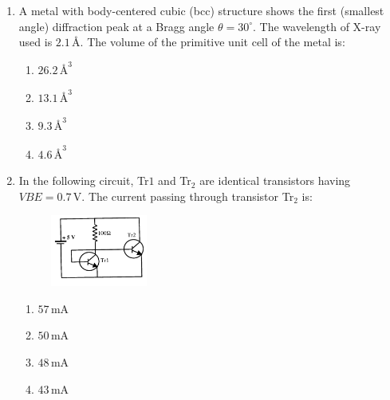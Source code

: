 \documentclass[journal,12pt,onecolumn]{IEEEtran}
\begin{document}
\begin{enumerate}
\begin{multicols}{4}
\begin{enumerate}
    \item $20\,\mathrm{cm^{-1}}$
    \item $40\,\mathrm{cm^{-1}}$
    \item $60\,\mathrm{cm^{-1}}$
    \item $120\,\mathrm{cm^{-1}}$
\end{enumerate}
\end{multicols}

\item A metal with body-centered cubic (bcc) structure shows the first (smallest angle) diffraction peak at a Bragg angle $\theta = 30^\circ$. The wavelength of X-ray used is $2.1\,\text{\AA}$. The volume of the primitive unit cell of the metal is:

\hfill{}

\begin{multicols}{4}
\begin{enumerate}
    \item $26.2\,\text{\AA}^3$
    \item $13.1\,\text{\AA}^3$
    \item $9.3\,\text{\AA}^3$
    \item $4.6\,\text{\AA}^3$
\end{enumerate}
\end{multicols}

\item In the following circuit, Tr$1$ and Tr$_2$ are identical transistors having $V{BE} = 0.7\,\mathrm{V}$. The current passing through transistor Tr$_2$ is:

\begin{figure}[ht!]
    \centering
    \includegraphics[width=0.3\textwidth]{fig6.jpeg}
    \caption{}
    \label{fig:fig6.jpeg}
\end{figure}


\hfill{}

\begin{multicols}{4}
\begin{enumerate}
    \item $57\,\mathrm{mA}$
    \item $50\,\mathrm{mA}$
    \item $48\,\mathrm{mA}$
    \item $43\,\mathrm{mA}$
\end{enumerate}
\end{multicols}


\end{enumerate}
\end{document}
